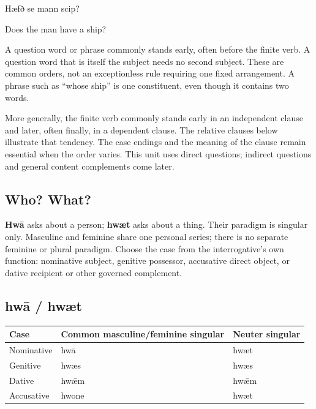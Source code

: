 Hæfð se mann scip?

Does the man have a ship?

A question word or phrase commonly stands early, often before the finite verb. A question word that is itself the subject needs no second subject. These are common orders, not an exceptionless rule requiring one fixed arrangement. A phrase such as “whose ship” is one constituent, even though it contains two words.

More generally, the finite verb commonly stands early in an independent clause and later, often finally, in a dependent clause. The relative clauses below illustrate that tendency. The case endings and the meaning of the clause remain essential when the order varies. This unit uses direct questions; indirect questions and general content complements come later.

\subsection*{Who? What?}

\textbf{Hwā} asks about a person; \textbf{hwæt} asks about a thing. Their paradigm is singular only. Masculine and feminine share one personal series; there is no separate feminine or plural paradigm. Choose the case from the interrogative’s own function: nominative subject, genitive possessor, accusative direct object, or dative recipient or other governed complement.

\subsection*{hwā /\allowbreak{} hwæt}

\par\begingroup
\fontsize{10.5}{13.2}\selectfont
\setlength{\LTleft}{0pt}\setlength{\LTright}{\fill}
\noindent
\begin{tabular}{@{}>{\raggedright\arraybackslash}p{25.54mm}>{\raggedright\arraybackslash}p{64.36mm}>{\raggedright\arraybackslash}p{28.48mm}@{}}
\toprule
\textbf{Case} & \textbf{Common masculine/\allowbreak{}feminine singular} & \textbf{Neuter singular} \\
\midrule
Nominative & hwā & hwæt \\
Genitive & hwæs & hwæs \\
Dative & hwǣm & hwǣm \\
Accusative & hwone & hwæt \\
\bottomrule
\end{tabular}
\par\endgroup

